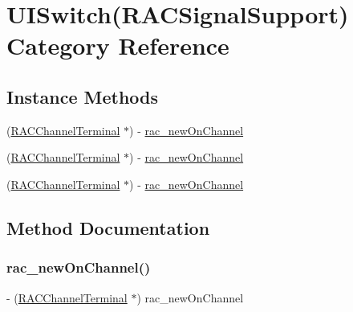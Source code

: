 \hypertarget{category_u_i_switch_07_r_a_c_signal_support_08}{}\section{U\+I\+Switch(R\+A\+C\+Signal\+Support) Category Reference}
\label{category_u_i_switch_07_r_a_c_signal_support_08}
\subsection*{Instance Methods}
\begin{DoxyCompactItemize}
\item 
(\mbox{\hyperlink{interface_r_a_c_channel_terminal}{R\+A\+C\+Channel\+Terminal}} $\ast$) -\/ \mbox{\hyperlink{category_u_i_switch_07_r_a_c_signal_support_08_aa4988be5efa10bfa187d4be7815941f3}{rac\+\_\+new\+On\+Channel}}
\item 
(\mbox{\hyperlink{interface_r_a_c_channel_terminal}{R\+A\+C\+Channel\+Terminal}} $\ast$) -\/ \mbox{\hyperlink{category_u_i_switch_07_r_a_c_signal_support_08_aa4988be5efa10bfa187d4be7815941f3}{rac\+\_\+new\+On\+Channel}}
\item 
(\mbox{\hyperlink{interface_r_a_c_channel_terminal}{R\+A\+C\+Channel\+Terminal}} $\ast$) -\/ \mbox{\hyperlink{category_u_i_switch_07_r_a_c_signal_support_08_aa4988be5efa10bfa187d4be7815941f3}{rac\+\_\+new\+On\+Channel}}
\end{DoxyCompactItemize}


\subsection{Method Documentation}
\mbox{\label{category_u_i_switch_07_r_a_c_signal_support_08_aa4988be5efa10bfa187d4be7815941f3}} 
\subsubsection{\texorpdfstring{rac\+\_\+new\+On\+Channel()}{rac\_newOnChannel()}\hspace{0.1cm}{\footnotesize\ttfamily [1/3]}}
{\footnotesize\ttfamily -\/ (\mbox{\hyperlink{interface_r_a_c_channel_terminal}{R\+A\+C\+Channel\+Terminal}} $\ast$) rac\+\_\+new\+On\+Channel \begin{DoxyParamCaption}{ }\end{DoxyParamCaption}}

